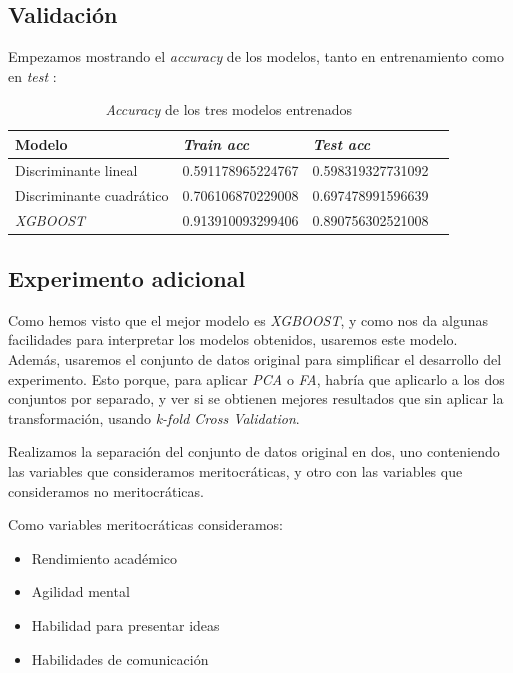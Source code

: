 \documentclass[11pt]{article}
\begin{document}
\subsection{Validación}

Empezamos mostrando el \textit{accuracy} de los modelos, tanto en entrenamiento como en \textit{test} \footnotemark:


\begin{table}[H]
\centering
\begin{tabular}{|l|l|l|l}
\hline
    Modelo               & \textit{Train acc} & \textit{Test acc}          \\
\hline
Discriminante lineal     & 0.591178965224767  & 0.598319327731092 \\
Discriminante cuadrático & 0.706106870229008  & 0.697478991596639 \\
\textit{XGBOOST}         & 0.913910093299406  & 0.890756302521008 \\
\hline
\end{tabular}
\caption{\textit{Accuracy} de los tres modelos entrenados}
\end{table}

\subsection{Experimento adicional}

Como hemos visto que el mejor modelo es \textit{XGBOOST}, y como nos da algunas facilidades para interpretar los modelos obtenidos, usaremos este modelo. Además, usaremos el conjunto de datos original para simplificar el desarrollo del experimento. Esto porque, para aplicar \textit{PCA} o \textit{FA}, habría que aplicarlo a los dos conjuntos por separado, y ver si se obtienen mejores resultados que sin aplicar la transformación, usando \textit{k-fold Cross Validation}.

Realizamos la separación del conjunto de datos original en dos, uno conteniendo las variables que consideramos meritocráticas, y otro con las variables que consideramos no meritocráticas.

Como variables meritocráticas consideramos:

\begin{itemize}
    \item Rendimiento académico
    \item Agilidad mental
    \item Habilidad para presentar ideas
    \item Habilidades de comunicación
\end{itemize}
\end{document}
